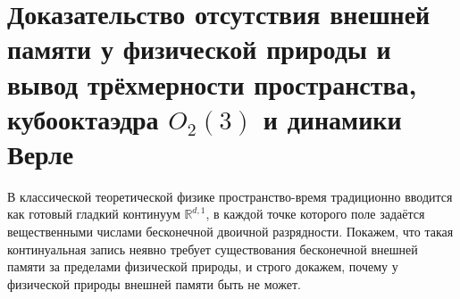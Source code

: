 \documentclass[11pt,a4paper]{article}
\theoremstyle{plain}
\theoremstyle{definition}
\begin{document}
\section{Доказательство отсутствия внешней памяти у физической природы и вывод трёхмерности пространства, кубооктаэдра \texorpdfstring{$O_2(3)$}{O2(3)} и динамики Верле}
\label{sec:axioms-uniqueness}

В классической теоретической физике пространство-время традиционно вводится как готовый гладкий континуум $\mathbb{R}^{d,1}$, в каждой точке которого поле задаётся вещественными числами бесконечной двоичной разрядности. Покажем, что такая континуальная запись неявно требует существования бесконечной внешней памяти за пределами физической природы, и строго докажем, почему у физической природы внешней памяти быть не может.
\end{document}
